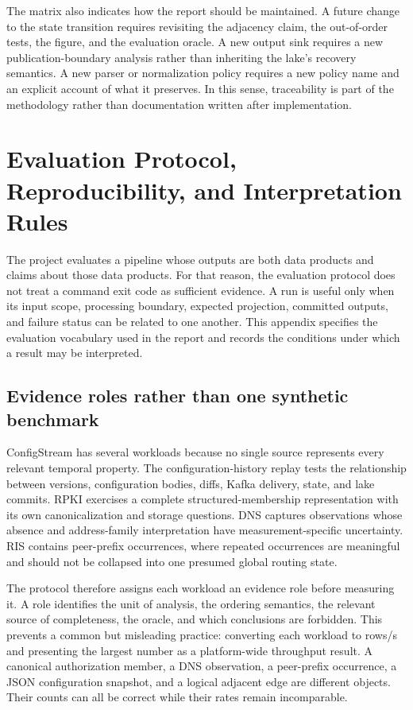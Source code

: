 \documentclass[a4paper,11pt]{article}
\begin{document}
The matrix also indicates how the report should be maintained. A future change to the state transition requires revisiting the adjacency claim, the out-of-order tests, the figure, and the evaluation oracle. A new output sink requires a new publication-boundary analysis rather than inheriting the lake's recovery semantics. A new parser or normalization policy requires a new policy name and an explicit account of what it preserves. In this sense, traceability is part of the methodology rather than documentation written after implementation.


\section{Evaluation Protocol, Reproducibility, and Interpretation Rules}
\label{app:evaluation-protocol}

The project evaluates a pipeline whose outputs are both data products and claims about those data products. For that reason, the evaluation protocol does not treat a command exit code as sufficient evidence. A run is useful only when its input scope, processing boundary, expected projection, committed outputs, and failure status can be related to one another. This appendix specifies the evaluation vocabulary used in the report and records the conditions under which a result may be interpreted.

\subsection{Evidence roles rather than one synthetic benchmark}

ConfigStream has several workloads because no single source represents every relevant temporal property. The configuration-history replay tests the relationship between versions, configuration bodies, diffs, Kafka delivery, state, and lake commits. RPKI exercises a complete structured-membership representation with its own canonicalization and storage questions. DNS captures observations whose absence and address-family interpretation have measurement-specific uncertainty. RIS contains peer-prefix occurrences, where repeated occurrences are meaningful and should not be collapsed into one presumed global routing state.

The protocol therefore assigns each workload an evidence role before measuring it. A role identifies the unit of analysis, the ordering semantics, the relevant source of completeness, the oracle, and which conclusions are forbidden. This prevents a common but misleading practice: converting each workload to rows/s and presenting the largest number as a platform-wide throughput result. A canonical authorization member, a DNS observation, a peer-prefix occurrence, a JSON configuration snapshot, and a logical adjacent edge are different objects. Their counts can all be correct while their rates remain incomparable.
\end{document}
